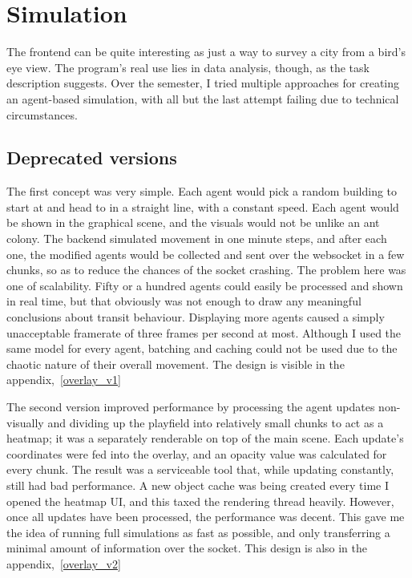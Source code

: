 \chapter{Simulation}

The frontend can be quite interesting as just a way to survey a city from a bird's eye view. The program's real use lies in data analysis, though, as the task description suggests. Over the semester, I tried multiple approaches for creating an agent-based simulation, with all but the last attempt failing due to technical circumstances.

\section{Deprecated versions}

The first concept was very simple. Each agent would pick a random building to start at and head to in a straight line, with a constant speed. Each agent would be shown in the graphical scene, and the visuals would not be unlike an ant colony. The backend simulated movement in one minute steps, and after each one, the modified agents would be collected and sent over the websocket in a few chunks, so as to reduce the chances of the socket crashing. The problem here was one of scalability. Fifty or a hundred agents could easily be processed and shown in real time, but that obviously was not enough to draw any meaningful conclusions about transit behaviour. Displaying more agents caused a simply unacceptable framerate of three frames per second at most. Although I used the same model for every agent, batching and caching could not be used due to the chaotic nature of their overall movement. The design is visible in the appendix,~\ref{overlay_v1}

The second version improved performance by processing the agent updates non-visually and dividing up the playfield into relatively small chunks to act as a heatmap; it was a separately renderable on top of the main scene. Each update's coordinates were fed into the overlay, and an opacity value was calculated for every chunk. The result was a serviceable tool that, while updating constantly, still had bad performance. A new object cache was being created every time I opened the heatmap UI, and this taxed the rendering thread heavily. However, once all updates have been processed, the performance was decent. This gave me the idea of running full simulations as fast as possible, and only transferring a minimal amount of information over the socket. This design is also in the appendix,~\ref{overlay_v2}

